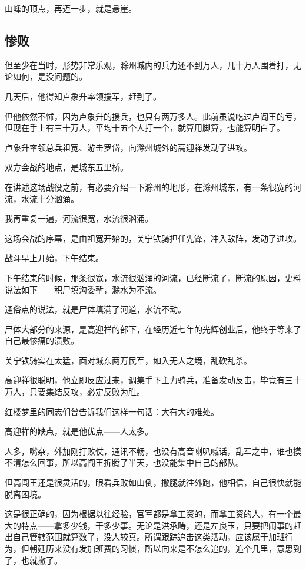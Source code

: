 \begin{multicols}{\theparacolNo}
山峰的顶点，再迈一步，就是悬崖。

\subsection{惨败}
但至少在当时，形势非常乐观，滁州城内的兵力还不到万人，几十万人围着打，无论如何，是没问题的。

几天后，他得知卢象升率领援军，赶到了。

但他依然不怵，因为卢象升的援兵，也只有两万多人。此前虽说吃过卢阎王的亏，但现在手上有三十万人，平均十五个人打一个，就算用脚算，也能算明白了。

卢象升率领总兵祖宽、游击罗岱，向滁州城外的高迎祥发动了进攻。

双方会战的地点，是城东五里桥。

在讲述这场战役之前，有必要介绍一下滁州的地形，在滁州城东，有一条很宽的河流，水流十分汹涌。

我再重复一遍，河流很宽，水流很汹涌。

这场会战的序幕，是由祖宽开始的，关宁铁骑担任先锋，冲入敌阵，发动了进攻。

战斗早上开始，下午结束。

下午结束的时候，那条很宽，水流很汹涌的河流，已经断流了，断流的原因，史料说法如下——积尸填沟委堑，滁水为不流。

通俗点的说法，就是尸体填满了河道，水流不动。

尸体大部分的来源，是高迎祥的部下，在经历近七年的光辉创业后，他终于等来了自己最惨痛的溃败。

关宁铁骑实在太猛，面对城东两万民军，如入无人之境，乱砍乱杀。

高迎祥很聪明，他立即反应过来，调集手下主力骑兵，准备发动反击，毕竟有三十万人，只要集结反攻，必定反败为胜。

红楼梦里的同志们曾告诉我们这样一句话：大有大的难处。

高迎祥的缺点，就是他优点——人太多。

人多，嘴杂，外加刚打败仗，通讯不畅，也没有高音喇叭喊话，乱军之中，谁也摸不清怎么回事，所以高闯王折腾了半天，也没能集中自己的部队。

但高闯王还是很灵活的，眼看兵败如山倒，撒腿就往外跑，他相信，自己很快就能脱离困境。

这是很正确的，因为根据以往经验，官军都是拿工资的，而拿工资的人，有一个最大的特点——拿多少钱，干多少事。无论是洪承畴，还是左良玉，只要把闹事的赶出自己管辖范围就算数了，没人较真。所谓跟踪追击这类活动，应该属于加班行为，但朝廷历来没有发加班费的习惯，所以向来是不怎么追的，追个几里，意思到了，也就撤了。


\end{multicols}

